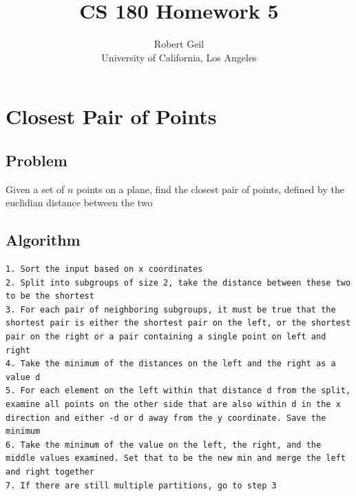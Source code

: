 \documentclass[titlepage]{article}
\title{CS 180 Homework 5}
\author{Robert Geil \\
University of California, Los Angeles
}
\numberwithin{equation}{subsection}
\begin{document}
\maketitle

\section{Closest Pair of Points}
\subsection{Problem}
Given a set of $n$ points on a plane, find the closest pair of points, defined by the euclidian distance
between the two
\subsection{Algorithm}
\begin{lstlisting}
1. Sort the input based on x coordinates
2. Split into subgroups of size 2, take the distance between these two to be the shortest
3. For each pair of neighboring subgroups, it must be true that the shortest pair is either the shortest pair on the left, or the shortest pair on the right or a pair containing a single point on left and right
4. Take the minimum of the distances on the left and the right as a value d
5. For each element on the left within that distance d from the split, examine all points on the other side that are also within d in the x direction and either -d or d away from the y coordinate. Save the minimum
6. Take the minimum of the value on the left, the right, and the middle values examined. Set that to be the new min and merge the left and right together
7. If there are still multiple partitions, go to step 3
\end{lstlisting}
\end{document}
